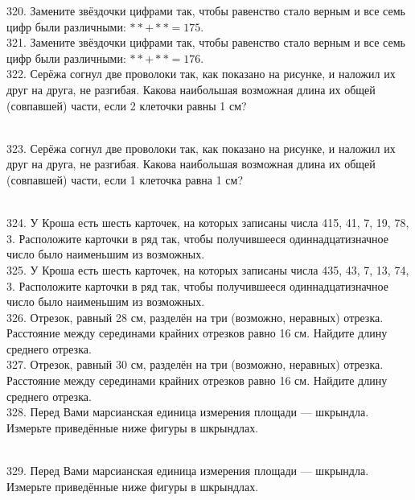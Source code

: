 320. Замените звёздочки цифрами так, чтобы равенство стало верным и все семь цифр были различными: $**+**=175.$\\
321. Замените звёздочки цифрами так, чтобы равенство стало верным и все семь цифр были различными: $**+**=176.$\\
322. Серёжа согнул две проволоки так, как показано на рисунке, и наложил их друг на друга, не разгибая. Какова наибольшая возможная длина их общей (совпавшей) части, если 2 клеточки равны 1 см?\\
\begin{figure}[ht!]
\end{figure}\\
323. Серёжа согнул две проволоки так, как показано на рисунке, и наложил их друг на друга, не разгибая. Какова наибольшая возможная длина их общей (совпавшей) части, если 1 клеточка равна 1 см?\\
\begin{figure}[ht!]
\end{figure}\\
324. У Кроша есть шесть карточек, на которых записаны числа 415, 41, 7, 19, 78, 3. Расположите карточки в ряд так, чтобы получившееся одиннадцатизначное число было наименьшим из возможных.\\
325. У Кроша есть шесть карточек, на которых записаны числа 435, 43, 7, 13, 74, 3. Расположите карточки в ряд так, чтобы получившееся одиннадцатизначное число было наименьшим из возможных.\\
326. Отрезок, равный 28 см, разделён на три (возможно, неравных) отрезка. Расстояние между серединами крайних отрезков равно 16 см. Найдите длину среднего отрезка.\\
327. Отрезок, равный 30 см, разделён на три (возможно, неравных) отрезка. Расстояние между серединами крайних отрезков равно 16 см. Найдите длину среднего отрезка.\\
328. Перед Вами марсианская единица измерения площади --- шкрындла. Измерьте приведённые ниже фигуры в
шкрындлах.\\
\begin{figure}[ht!]
\end{figure}\\
329. Перед Вами марсианская единица измерения площади --- шкрындла. Измерьте приведённые ниже фигуры в
шкрындлах.\\
\begin{figure}[ht!]
\end{figure}\\
